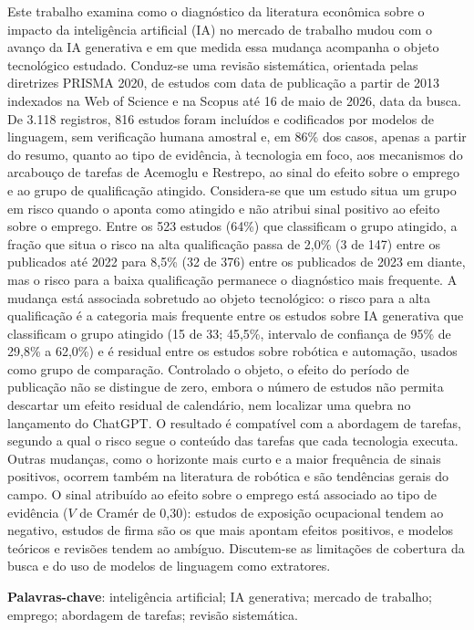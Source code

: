 \begin{resumo}\SingleSpacing
Este trabalho examina como o diagnóstico da literatura econômica sobre o impacto da inteligência artificial (IA) no mercado de trabalho mudou com o avanço da IA generativa e em que medida essa mudança acompanha o objeto tecnológico estudado. Conduz-se uma revisão sistemática, orientada pelas diretrizes PRISMA 2020, de estudos com data de publicação a partir de 2013 indexados na Web of Science e na Scopus até 16 de maio de 2026, data da busca. De 3.118 registros, 816 estudos foram incluídos e codificados por modelos de linguagem, sem verificação humana amostral e, em 86\% dos casos, apenas a partir do resumo, quanto ao tipo de evidência, à tecnologia em foco, aos mecanismos do arcabouço de tarefas de Acemoglu e Restrepo, ao sinal do efeito sobre o emprego e ao grupo de qualificação atingido. Considera-se que um estudo situa um grupo em risco quando o aponta como atingido e não atribui sinal positivo ao efeito sobre o emprego. Entre os 523 estudos (64\%) que classificam o grupo atingido, a fração que situa o risco na alta qualificação passa de 2,0\% (3 de 147) entre os publicados até 2022 para 8,5\% (32 de 376) entre os publicados de 2023 em diante, mas o risco para a baixa qualificação permanece o diagnóstico mais frequente. A mudança está associada sobretudo ao objeto tecnológico: o risco para a alta qualificação é a categoria mais frequente entre os estudos sobre IA generativa que classificam o grupo atingido (15 de 33; 45,5\%, intervalo de confiança de 95\% de 29,8\% a 62,0\%) e é residual entre os estudos sobre robótica e automação, usados como grupo de comparação. Controlado o objeto, o efeito do período de publicação não se distingue de zero, embora o número de estudos não permita descartar um efeito residual de calendário, nem localizar uma quebra no lançamento do ChatGPT. O resultado é compatível com a abordagem de tarefas, segundo a qual o risco segue o conteúdo das tarefas que cada tecnologia executa. Outras mudanças, como o horizonte mais curto e a maior frequência de sinais positivos, ocorrem também na literatura de robótica e são tendências gerais do campo. O sinal atribuído ao efeito sobre o emprego está associado ao tipo de evidência ($V$ de Cramér de 0,30): estudos de exposição ocupacional tendem ao negativo, estudos de firma são os que mais apontam efeitos positivos, e modelos teóricos e revisões tendem ao ambíguo. Discutem-se as limitações de cobertura da busca e do uso de modelos de linguagem como extratores.

\noindent
\textbf{Palavras-chave}: inteligência artificial; IA generativa; mercado de trabalho; emprego; abordagem de tarefas; revisão sistemática.
\end{resumo}
